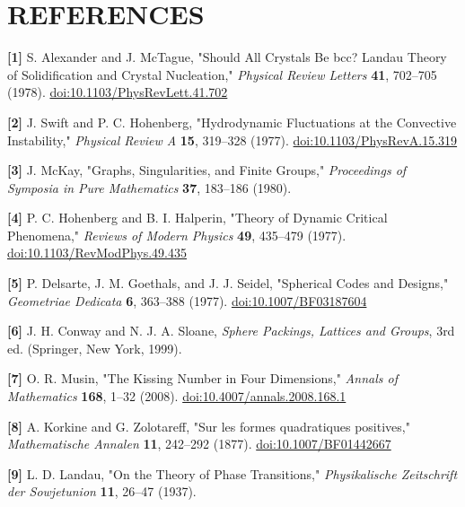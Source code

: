 \documentclass[a4paper,11pt]{article}
\begin{document}
\section*{REFERENCES}

\label{ref1}
\noindent \textbf{[1]} S. Alexander and J. McTague, "Should All Crystals Be bcc? Landau Theory of Solidification and Crystal Nucleation," \textit{Physical Review Letters} \textbf{41}, 702–705 (1978). \href{https://doi.org/10.1103/PhysRevLett.41.702}{doi:10.1103/PhysRevLett.41.702}


\label{ref2}
\noindent \textbf{[2]} J. Swift and P. C. Hohenberg, "Hydrodynamic Fluctuations at the Convective Instability," \textit{Physical Review A} \textbf{15}, 319–328 (1977). \href{https://doi.org/10.1103/PhysRevA.15.319}{doi:10.1103/PhysRevA.15.319}


\label{ref3}
\noindent \textbf{[3]} J. McKay, "Graphs, Singularities, and Finite Groups," \textit{Proceedings of Symposia in Pure Mathematics} \textbf{37}, 183–186 (1980).


\label{ref4}
\noindent \textbf{[4]} P. C. Hohenberg and B. I. Halperin, "Theory of Dynamic Critical Phenomena," \textit{Reviews of Modern Physics} \textbf{49}, 435–479 (1977). \href{https://doi.org/10.1103/RevModPhys.49.435}{doi:10.1103/RevModPhys.49.435}


\label{ref5}
\noindent \textbf{[5]} P. Delsarte, J. M. Goethals, and J. J. Seidel, "Spherical Codes and Designs," \textit{Geometriae Dedicata} \textbf{6}, 363–388 (1977). \href{https://doi.org/10.1007/BF03187604}{doi:10.1007/BF03187604}


\label{ref6}
\noindent \textbf{[6]} J. H. Conway and N. J. A. Sloane, \textit{Sphere Packings, Lattices and Groups}, 3rd ed. (Springer, New York, 1999).


\label{ref7}
\noindent \textbf{[7]} O. R. Musin, "The Kissing Number in Four Dimensions," \textit{Annals of Mathematics} \textbf{168}, 1–32 (2008). \href{https://doi.org/10.4007/annals.2008.168.1}{doi:10.4007/annals.2008.168.1}


\label{ref8}
\noindent \textbf{[8]} A. Korkine and G. Zolotareff, "Sur les formes quadratiques positives," \textit{Mathematische Annalen} \textbf{11}, 242–292 (1877). \href{https://doi.org/10.1007/BF01442667}{doi:10.1007/BF01442667}


\label{ref9}
\noindent \textbf{[9]} L. D. Landau, "On the Theory of Phase Transitions," \textit{Physikalische Zeitschrift der Sowjetunion} \textbf{11}, 26–47 (1937).
\end{document}
